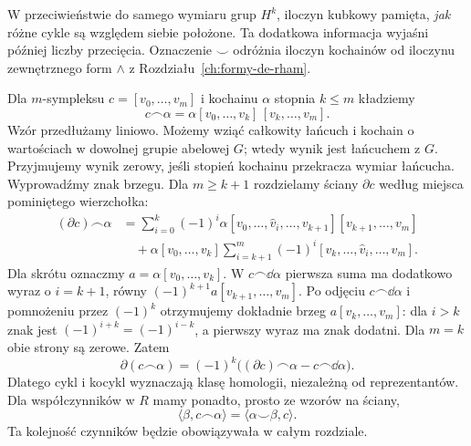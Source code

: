 W przeciwieństwie do samego wymiaru
grup $H^k$, iloczyn kubkowy pamięta,
\emph{jak} różne cykle są względem siebie
położone. Ta dodatkowa informacja
wyjaśni później liczby przecięcia.
Oznaczenie $\smile$ odróżnia
iloczyn kochainów od iloczynu
zewnętrznego form $\wedge$ z
Rozdziału~\ref{ch:formy-de-rham}.

\begin{definicja}
\label{def:kapowy-16}
Dla $m$-sympleksu $c=[v_0,\ldots,v_m]$ i kochainu
$\alpha$ stopnia $k\leq m$ kładziemy
\[
 c\frown\alpha=\alpha[v_0,\ldots,v_k]\,[v_k,\ldots,v_m].
\]
Wzór przedłużamy liniowo. Możemy wziąć całkowity łańcuch
i kochain o wartościach w dowolnej grupie abelowej $G$;
wtedy wynik jest łańcuchem z $G$.
Przyjmujemy wynik zerowy, jeśli stopień kochainu
przekracza wymiar łańcucha.
Wyprowadźmy znak brzegu. Dla $m\geq k+1$ rozdzielamy
ściany $\partial c$ według miejsca pominiętego wierzchołka:
\[
 \begin{aligned}
 (\partial c)\frown\alpha
 &=\sum_{i=0}^k(-1)^i
   \alpha[v_0,\ldots,\widehat v_i,\ldots,v_{k+1}]
                         [v_{k+1},\ldots,v_m]\\
 &\quad+\alpha[v_0,\ldots,v_k]
   \sum_{i=k+1}^m(-1)^i[v_k,\ldots,\widehat v_i,\ldots,v_m].
 \end{aligned}
\]
Dla skrótu oznaczmy $a=\alpha[v_0,\ldots,v_k]$.
W $c\frown\dd\alpha$ pierwsza suma ma dodatkowo wyraz
o $i=k+1$, równy
$(-1)^{k+1}a[v_{k+1},\ldots,v_m]$.
Po odjęciu $c\frown\dd\alpha$ i pomnożeniu przez $(-1)^k$
otrzymujemy dokładnie brzeg $a[v_k,\ldots,v_m]$:
dla $i>k$ znak jest $(-1)^{i+k}=(-1)^{i-k}$,
a pierwszy wyraz ma znak dodatni.
Dla $m=k$ obie strony są zerowe. Zatem
\begin{equation}\label{eq:kapowy-brzeg-16}
 \partial(c\frown\alpha)=(-1)^k
  \bigl((\partial c)\frown\alpha-c\frown\dd\alpha\bigr).
\end{equation}
Dlatego cykl i kocykl wyznaczają klasę homologii,
niezależną od reprezentantów. Dla współczynników w $R$
mamy ponadto, prosto ze wzorów na ściany,
\[
 \langle\beta,c\frown\alpha\rangle
 =\langle\alpha\smile\beta,c\rangle.
\]
Ta kolejność czynników będzie obowiązywała w całym rozdziale.
\end{definicja}

